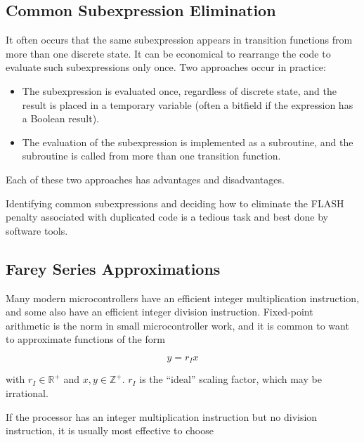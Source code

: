 \documentclass[letterpaper,10pt,titlepage]{article}
\begin{document}

\subsection{Common Subexpression Elimination}
\label{sfrr0:scse0}

It often occurs that the same subexpression appears in transition functions from
more than one discrete state.  It can be economical to rearrange the 
code to evaluate such subexpressions
only once.  Two approaches occur in practice:

\begin{itemize}
\item The subexpression is evaluated once, regardless of discrete state, and the
      result is placed in a temporary variable (often a bitfield if the expression
      has a Boolean result).
\item The evaluation of the subexpression is implemented as a subroutine, and
      the subroutine is called from more than one transition function.
\end{itemize}

Each of these two approaches has advantages and disadvantages.

Identifying common subexpressions and deciding how to eliminate the FLASH
penalty associated with duplicated code is a tedious task and best done
by software tools.


\subsection{Farey Series Approximations}
\label{sfrr0:sfsa0}

Many modern microcontrollers have an efficient integer multiplication
instruction, and some also have an efficient integer division instruction.
Fixed-point arithmetic is the norm in small microcontroller work, and it
is common to want to approximate functions of the form

\begin{equation}
y = r_I x
\end{equation}

\noindent{}with $r_I \in \mathbb{R}^+$ and $x,y \in \mathbb{Z}^+$.  $r_I$ is the
``ideal'' scaling factor, which may be irrational.

If the processor has an integer multiplication instruction but no division
instruction, it is usually most effective to choose
\end{document}
